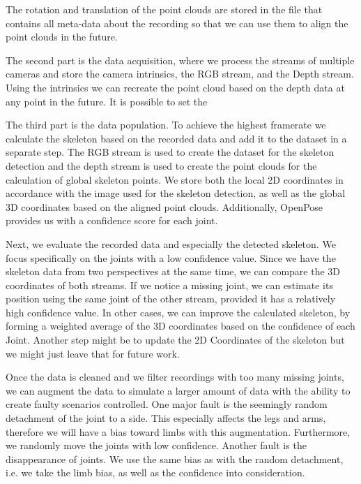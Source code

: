 The rotation and translation of the point clouds are stored in the file that contains all meta-data about the recording so that we can use them to align the point clouds in the future.

The second part is the data acquisition, where we process the streams of multiple cameras and store the camera intrinsics, the RGB stream, and the Depth stream. Using the intrinsics we can recreate the point cloud based on the depth data at any point in the future. It is possible to set the 

The third part is the data population. To achieve the highest framerate we calculate the skeleton based on the recorded data and add it to the dataset in a separate step. The RGB stream is used to create the dataset for the skeleton detection and the depth stream is used to create the point clouds for the calculation of global skeleton points. We store both the local 2D coordinates in accordance with the image used for the skeleton detection, as well as the global 3D coordinates based on the aligned point clouds. Additionally, OpenPose provides us with a confidence score for each joint.

Next, we evaluate the recorded data and especially the detected skeleton. We focus specifically on the joints with a low confidence value. Since we have the skeleton data from two perspectives at the same time, we can compare the 3D coordinates of both streams. If we notice a missing joint, we can estimate its position using the same joint of the other stream, provided it has a relatively high confidence value. In other cases, we can improve the calculated skeleton, by forming a weighted average of the 3D coordinates based on the confidence of each Joint. Another step might be to update the 2D Coordinates of the skeleton but we might just leave that for future work. %

Once the data is cleaned and we filter recordings with too many missing joints, we can augment the data to simulate a larger amount of data with the ability to create faulty scenarios controlled. One major fault is the seemingly random detachment of the joint to a side. This especially affects the legs and arms, therefore we will have a bias toward limbs with this augmentation. Furthermore, we randomly move the joints with low confidence. Another fault is the disappearance of joints. We use the same bias as with the random detachment, i.e. we take the limb bias, as well as the confidence into consideration.

